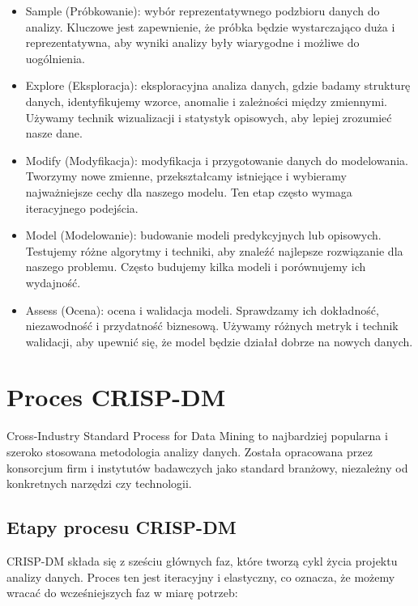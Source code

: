 \documentclass[
  polish,
  letterpaper,
  DIV=11,
  numbers=noendperiod]{scrreprt}
\begin{document}
\begin{itemize}
\item
  Sample (Próbkowanie): wybór reprezentatywnego podzbioru danych do
  analizy. Kluczowe jest zapewnienie, że próbka będzie wystarczająco
  duża i reprezentatywna, aby wyniki analizy były wiarygodne i możliwe
  do uogólnienia.
\item
  Explore (Eksploracja): eksploracyjna analiza danych, gdzie badamy
  strukturę danych, identyfikujemy wzorce, anomalie i zależności między
  zmiennymi. Używamy technik wizualizacji i statystyk opisowych, aby
  lepiej zrozumieć nasze dane.
\item
  Modify (Modyfikacja): modyfikacja i przygotowanie danych do
  modelowania. Tworzymy nowe zmienne, przekształcamy istniejące i
  wybieramy najważniejsze cechy dla naszego modelu. Ten etap często
  wymaga iteracyjnego podejścia.
\item
  Model (Modelowanie): budowanie modeli predykcyjnych lub opisowych.
  Testujemy różne algorytmy i techniki, aby znaleźć najlepsze
  rozwiązanie dla naszego problemu. Często budujemy kilka modeli i
  porównujemy ich wydajność.
\item
  Assess (Ocena): ocena i walidacja modeli. Sprawdzamy ich dokładność,
  niezawodność i przydatność biznesową. Używamy różnych metryk i technik
  walidacji, aby upewnić się, że model będzie działał dobrze na nowych
  danych.
\end{itemize}

\section{Proces CRISP-DM}\label{proces-crisp-dm}

Cross-Industry Standard Process for Data Mining to najbardziej popularna
i szeroko stosowana metodologia analizy danych. Została opracowana przez
konsorcjum firm i instytutów badawczych jako standard branżowy,
niezależny od konkretnych narzędzi czy technologii.

\subsection{Etapy procesu CRISP-DM}\label{etapy-procesu-crisp-dm}

CRISP-DM składa się z sześciu głównych faz, które tworzą cykl życia
projektu analizy danych. Proces ten jest iteracyjny i elastyczny, co
oznacza, że możemy wracać do wcześniejszych faz w miarę potrzeb:
\end{document}

